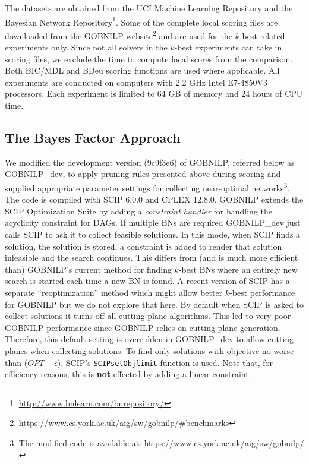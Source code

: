 \documentclass[letterpaper]{article}
\newcommand{\opt}{\mathit{OPT}}
\newcommand{\gobnilp}{GOBNILP}
\begin{document}
The datasets are obtained from the UCI Machine Learning Repository \cite{Dua:2017} and the Bayesian Network Repository\footnote{\url{http://www.bnlearn.com/bnrepository/}}. Some of the complete local scoring files are downloaded from the \gobnilp{} website\footnote{\url{https://www.cs.york.ac.uk/aig/sw/gobnilp/#benchmarks}} and are used for the $k$-best related experiments only. Since not all solvers in the $k$-best experiments can take in scoring files, we exclude the time to compute local scores from the comparison. Both BIC/MDL \cite{Schwarz78,LamB94} and BDeu \cite{Buntine91,HeckermanGC95} scoring functions are used where applicable. All experiments are conducted on computers with 2.2 GHz Intel E7-4850V3 processors. Each experiment is limited to 64 GB of memory and 24 hours of CPU time.



\subsection{The Bayes Factor Approach}

We modified the development version (9c9f3e6) of GOBNILP, referred below as \gobnilp{\_dev}, to apply pruning rules presented above during scoring and supplied appropriate parameter settings for collecting near-optimal networks\footnote{The modified code is available at: \url{https://www.cs.york.ac.uk/aig/sw/gobnilp/}}. The code is compiled with SCIP 6.0.0 and CPLEX 12.8.0. \gobnilp{} extends the SCIP Optimization Suite
\cite{GleixnerEtal2018OO} by adding a \emph{constraint handler} for
handling the acyclicity constraint for DAGs. If multiple BNs are
required \gobnilp{\_dev} just calls SCIP to ask it to collect feasible
solutions.  In this mode, when SCIP finds a solution, the solution is stored, a
constraint is added to render that solution infeasible and the search
continues. This differs from (and is much more efficient than)
\gobnilp 's current method for finding $k$-best BNs where an entirely
new search is started each time a new BN is found. A recent version of
SCIP has a separate ``reoptimization'' method which might allow better
$k$-best performance for \gobnilp{} but we do not explore that here.
By default when SCIP is asked to collect solutions it turns off all
cutting plane algorithms. This led to very poor \gobnilp{} performance
since \gobnilp{} relies on cutting plane generation. Therefore, this default setting is overridden in \gobnilp{\_dev} to allow cutting planes when collecting solutions.
To find only solutions with objective no worse than ($\opt + \epsilon$), SCIP's
\texttt{SCIPsetObjlimit} function is used. Note that, for efficiency
reasons, this is \textbf{not} effected by adding a linear constraint.
\end{document}

